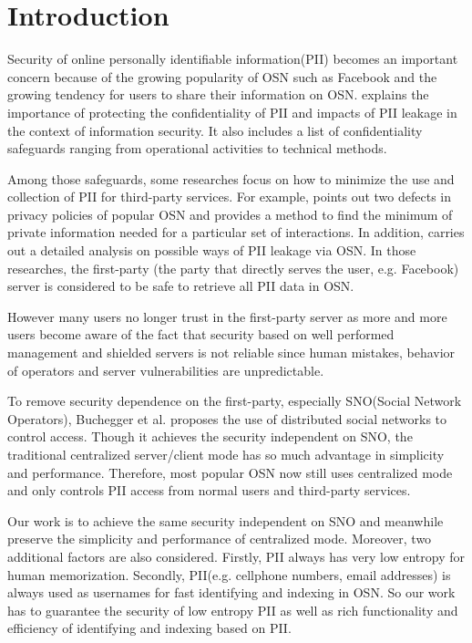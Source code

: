 \documentclass[10pt, conference, compsocconf]{IEEEtran}
\begin{document}
\section{Introduction}
	Security of online personally identifiable information(PII) becomes 
	an important concern \cite{lzf1, lzf2} because
    of the growing popularity of OSN such as Facebook\cite{facebook} and
    the growing tendency for users to share their information
    on OSN. 
    \cite{guide} explains the importance of protecting the confidentiality of PII
    and impacts of PII leakage in the
    context of information security. It also includes a list of confidentiality
    safeguards ranging from operational activities to technical methods. 
    
    Among those safeguards, some researches focus on how to minimize the use and
    collection of PII for third-party services. 
    For example, \cite{charact} points out two defects
    in privacy policies of popular OSN and provides a method to find the minimum
    of private information needed for a particular set of interactions. In addition,
    \cite{leakage} carries out a detailed analysis on possible ways of PII
    leakage via OSN.     
    In those researches, the first-party (the party that directly serves the user, e.g. Facebook) 
    server is considered to be safe to retrieve all PII data in OSN.
    
    However many users no longer trust in the first-party server
    as more and more users become aware of the fact that security 
    based on well performed management and shielded
    servers is not reliable since human mistakes, behavior of operators and server
    vulnerabilities are unpredictable.

	To remove security dependence on the first-party, especially SNO(Social Network Operators),
	Buchegger et al.\cite{lzf3, lzf4} proposes the use of distributed social networks
    to control access.
    Though it achieves the security independent on SNO, the traditional centralized server/client
    mode has so much advantage in simplicity and performance. Therefore,
    most popular OSN now still uses centralized mode and only controls PII access from
    normal users and third-party services.
    
    Our work is to achieve the same security independent on SNO and meanwhile preserve
    the simplicity and performance of centralized mode. Moreover, two additional factors
    are also considered. Firstly, PII always has very low entropy for human memorization.
    Secondly, PII(e.g. cellphone numbers, email addresses) is always used as usernames
    for fast identifying and indexing in OSN.
    So our work has to guarantee the security of low entropy PII as
    well as rich functionality and efficiency of identifying and indexing based on PII.
\end{document}
